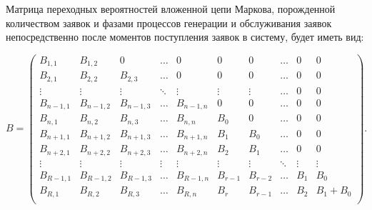 \smallskip
\begin{multicols}{2}

Матрица переходных вероятностей вложенной цепи Маркова, порожденной количеством 
заявок и фазами процессов генерации и обслуживания заявок непосредственно после 
моментов поступления заявок в систему, будет иметь вид: 
{

}
\end{multicols}

\smallskip
\noindent
$$
B=
  \begin{pmatrix}
B_{1,1}      & B_{1,2}      &  0          & \ldots &  0         &  0
     &  0      & \ldots & 0 & 0    \\
B_{2,1}      & B_{2,2}      & B_{2,3}      & \ldots &  0         &  0
     &  0      & \ldots & 0 & 0    \\
\vdots      & \vdots      & \vdots      & \ddots & \vdots     & \vdots
     & \vdots  & \ldots & 0 & 0 \\
B_{n-1,1}   & B_{n-1,2}   & B_{n-1,3}   & \ldots & B_{n-1,n}  &  0
     &  0      & \ldots & 0 & 0    \\
B_{n,1}      & B_{n,2}      & B_{n,3}      & \ldots & B_{n,n}     & B_0
     &  0      & \ldots & 0 & 0  \\
B_{n+1,1}   & B_{n+1,2}   & B_{n+1,3}   & \ldots & B_{n+1,n}  & B_1
     & B_0     & \ldots & 0 & 0  \\
B_{n+2,1}   & B_{n+2,2}   & B_{n+2,3}   & \ldots & B_{n+2,n}  & B_2
     & B_1     & \ldots & 0 & 0 \\
\vdots      & \vdots      & \vdots      & \vdots & \vdots      & \vdots
     & \vdots  & \ddots & \vdots &\vdots  \\
B_{R-1,1} & B_{R-1,2} & B_{R-1,3} & \ldots & B_{R-1,n} & B_{r-1}
     & B_{r-2} & \ldots & B_{1}  & B_{0} \\
B_{R,1}   & B_{R,2}   & B_{R,3}   & \ldots & B_{R,n}   & B_r
     & B_{r-1} & \ldots & B_{2}  & B_{1}+B_{0} \\
\end{pmatrix}.
$$
\smallskip
